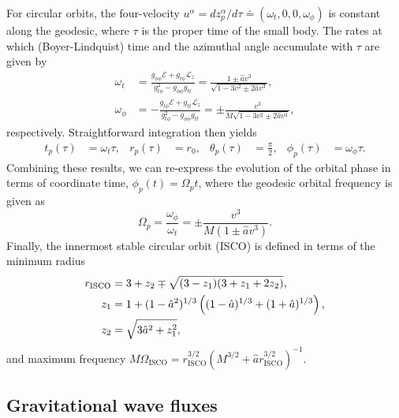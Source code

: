 \documentclass[%
 reprint,
 nofootinbib,
 amsmath,amssymb,
 aps,
 prd,
]{revtex4-2}
\begin{document}
For circular orbits, the four-velocity $u^\alpha = dz_p^\alpha/d\tau \doteq (\omega_t, 0, 0, \omega_\phi)$ is constant along the geodesic, where $\tau$ is the proper time of the small body. The rates at which (Boyer-Lindquist) time and the azimuthal angle accumulate with $\tau$ are given by
\begin{subequations}
\begin{align}
    \omega_t &= \frac{g_{\phi\phi} \mathcal{E} + g_{t\phi}\mathcal{L}_z}{g_{t\phi}^2-g_{\phi\phi}g_{tt}} = \frac{1 \pm \hat{a} v^3}{\sqrt{1 - 3 v^2 \pm 2 \hat{a} v^3}},
    \\
    \omega_\phi &= -\frac{g_{t\phi} \mathcal{E} + g_{tt}\mathcal{L}_z}{g_{t\phi}^2-g_{\phi\phi}g_{tt}} = \pm \frac{v^3}{M\sqrt{1 - 3 v^2 \pm 2 \hat{a} v^3}},
\end{align}
\end{subequations}
respectively. Straightforward integration then yields
\begin{align*}
    t_p(\tau) &= \omega_t \tau,
    &
    r_p(\tau) &= r_0,
    &
    \theta_p(\tau) &= \frac{\pi}{2},
    &
    \phi_p(\tau) &= \omega_\phi\tau.
\end{align*}
Combining these results, we can re-express the evolution of the orbital phase in terms of coordinate time, $\phi_p(t) = \Omega_p t$, where the geodesic orbital frequency is given as
\begin{equation} \label{eqn:OmegaOfR}
    \Omega_p = \frac{\omega_\phi}{\omega_t}
    = \pm \frac{v^3}{M(1 \pm \hat{a} v^3)}.
\end{equation}
Finally, the innermost stable circular orbit (ISCO) is defined in terms of the minimum radius
\begin{align}
    r_\mathrm{ISCO} &= 3 + z_2 \mp
    \sqrt{(3 - z_1)(3 + z_1 + 2z_2)},
    \\ \notag
    z_1 & = 1 + (1 - \hat{a}^2)^{1/3}
    \left((1-\hat{a})^{1/3} + (1 + \hat{a})^{1/3} \right),
    \\ \notag
    z_2 &= \sqrt{3 \hat{a}^2 + z_1^2},
\end{align}
and maximum frequency $M\Omega_\mathrm{ISCO} = r_\mathrm{ISCO}^{3/2}(M^{3/2} + \hat{a} r_\mathrm{ISCO}^{3/2})^{-1}$.

\subsection{Gravitational wave fluxes}
\label{sec:fluxes}
\end{document}
